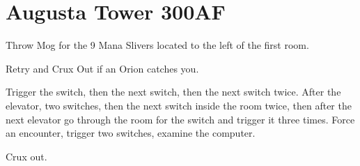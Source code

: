 \chapter{Augusta Tower 300AF}

Throw Mog for the 9 Mana Slivers located to the left of the first room.

Retry and Crux Out if an Orion catches you.

Trigger the switch, then the next switch, then the next switch twice. After the elevator, two switches, then the next switch inside the room twice, then after the next elevator go through the room for the switch and trigger it three times. Force an encounter, trigger two switches, examine the computer.

\livet{\squarec}

Crux out.
\newline
